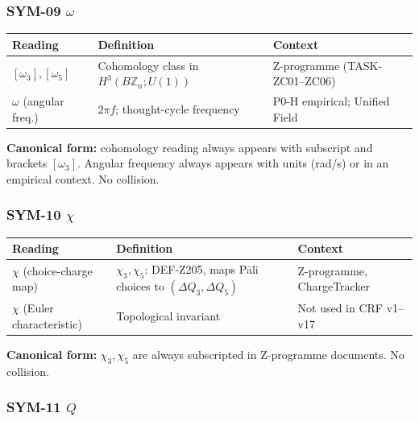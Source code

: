 \documentclass[12pt, a4paper]{article}
\begin{document}
\subsubsection*{SYM-09 \quad $\omega$}

\begin{yellowbox}[title={SYM-09 \textmd{---} $\omega$ \textmd{(two readings)}}]
\renewcommand{\arraystretch}{1.35}
\begin{tabular}{p{2.8cm} p{4.5cm} p{4.5cm}}
\toprule
\textbf{Reading} & \textbf{Definition} & \textbf{Context}\\
\midrule
$[\omega_3],[\omega_5]$ &
  Cohomology class in $H^3(B\mathbb{Z}_n;U(1))$ &
  Z-programme (TASK-ZC01--ZC06)\\
$\omega$ (angular freq.) &
  $2\pi f$; thought-cycle frequency &
  P0-H empirical; Unified Field\\
\bottomrule
\end{tabular}

\medskip
\textbf{Canonical form:} cohomology reading always appears with
subscript and brackets $[\omega_3]$. Angular frequency always
appears with units (rad/s) or in an empirical context.
No collision.
\end{yellowbox}

\subsubsection*{SYM-10 \quad $\chi$}

\begin{yellowbox}[title={SYM-10 \textmd{---} $\chi$ \textmd{(two readings)}}]
\renewcommand{\arraystretch}{1.35}
\begin{tabular}{p{2.8cm} p{4.5cm} p{4.5cm}}
\toprule
\textbf{Reading} & \textbf{Definition} & \textbf{Context}\\
\midrule
$\chi$ (choice-charge map) &
  $\chi_3, \chi_5$: DEF-Z205, maps Pāli choices to
  $(\Delta Q_3, \Delta Q_5)$ &
  Z-programme, ChargeTracker\\
$\chi$ (Euler characteristic) &
  Topological invariant &
  Not used in CRF v1--v17\\
\bottomrule
\end{tabular}

\medskip
\textbf{Canonical form:} $\chi_3, \chi_5$ are always subscripted
in Z-programme documents. No collision.
\end{yellowbox}

\subsubsection*{SYM-11 \quad $Q$}
\end{document}
